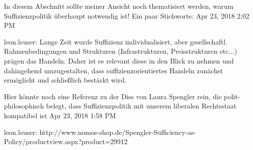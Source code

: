 In diesem Abschnitt sollte meiner Ansicht noch thematisiert werden, warum Suffizienzpolitik überhaupt notwendig ist! Ein paar Stichworte:
Apr 23, 2018 2:02 PM

leon.leuser: Lange Zeit wurde Suffizienz individualisiert, aber gesellschaftl. Rahmenbedingungen und Strukturen (Infrastrukturen, Preisstrukturen etc...) prägen das Handeln. Daher ist es relevant diese in den Blick zu nehmen und dahingehend umzugestalten, dass suffizienzorientiertes Handeln zunächst ermöglicht und schließlich bestärkt wird.

Hier könnte noch eine Referenz zu der Diss von Laura Spengler rein, die polit-philosophisch belegt, dass Suffizienzpolitik mit unserem liberalen Rechtsstaat kompatibel ist
Apr 23, 2018 1:58 PM

leon.leuser: http://www.nomos-shop.de/Spengler-Sufficiency-as-Policy/productview.aspx?product=29912